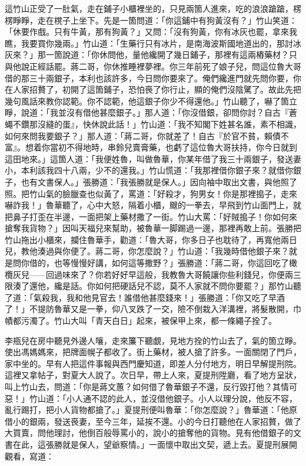 這竹山正受了一肚氣，走在鋪子小櫃裡坐的，只見兩箇人進來，吃的浪浪蹌蹌，楞楞睜睜，走在櫈子上坐下。{}先是一箇問道：「你這鋪中有狗黃沒有？」竹山笑道：「休要作戲。只有牛黃，那有狗黃？」又問：「沒有狗黃，你有冰灰也罷，拿來我瞧，我要買你幾兩。」竹山道：「生藥行只有冰片，是南海波斯國地道出的，那討冰灰來？」那一箇說道：「你休問他，量他纔開了幾日鋪子，那裡有這兩樁藥材？只與他說正經話罷。蔣二哥，你休推睡裡夢裡。你三年前死了娘子兒，問這位魯大哥借的那三十兩銀子，本利也該許多，今日問你要來了。俺們纔進門就先問你要，你在人家招贅了，初開了這箇鋪子，恐怕䘮了你行止，顯的俺們沒陰騭了。故此先把幾句風話來教你認範。你不認範，他這銀子你少不得還他。」竹山聽了，嚇了箇立睜，說道：「我並沒有借他甚麼銀子。」那人道：「你沒借銀，卻問你討？自古『蒼蠅不鑽那沒縫的蛋』，快休說此話！」竹山道：「我不知閣下姓甚名誰，素不相識，如何來問我要銀子？」那人道：「蔣二哥，你就差了！自古『於官不貧，賴債不富』。想着你當初不得地時，串鈴兒賣膏藥，{}也虧了這位魯大哥扶持，你今日就到這田地來。」這箇人道：「我便姓魯，叫做魯華，{}你某年借了我三十兩銀子，發送妻小，本利該我四十八兩，少不的還我。」竹山慌道：「我那裡借你銀子來？就借你銀子，也有文書保人。」張勝道：「我張勝就是保人。」因向袖中取出文書，與他照了照。把竹山氣的臉臘查也似黃了，罵道：「好殺才，狗男女！你是那裡搗子，走來嚇詐我！」魯華聽了，心中大怒，隔着小櫃，颼的一拳去，早飛到竹山面門上，就把鼻子打歪在半邊，一面把架上藥材撒了一街。竹山大罵：「好賊搗子！你如何來搶奪我貨物？」因叫天福兒來幫助，被魯華一脚踢過一邊，那裡再敢上前。張勝把竹山拖出小櫃來，攔住魯華手，勸道：「魯大哥，你多日子也耽待了，再寬他兩日兒，教他湊過與你便了。蔣二哥，你怎麼說？」竹山道：「我幾時借他銀子來？就是問你借的，也等慢慢好講，如何這等撒野？」張勝道：「蔣二哥，你這回吃了橄欖灰兒——回過味來了？你若好好早這般，我教魯大哥饒讓你些利錢兒，你便兩三限湊了還他，纔是話。你如何把硬話兒不認，莫不人家就不問你要罷？」那竹山聽了道：「氣殺我，我和他見官去！誰借他甚麼錢來！」張勝道：「你又吃了早酒了！」不提防魯華又是一拳，仰八叉跌了一交，險不倒栽入洋溝裡，將髮散開，巾幘都污濁了。竹山大叫「青天白日」起來，被保甲上來，都一條繩子拴了。

李瓶兒在房中聽見外邊人嚷，走來簾下聽覷，見地方拴的竹山去了，氣的箇立睜。使出馮媽媽來，把牌面幌子都收了。街上藥材，被人搶了許多。一面關閉了門戶，家中坐的。早有人把這件事報與西門慶知道，即差人分付地方，明日早解提刑院。這裡又拿帖子，對夏大人說了。次日早，帶上人來，夏提刑陞廳，看了地方呈狀，叫上竹山去，問道：「你是蔣文蕙？如何借了魯華銀子不還，反行毀打他？其情可惡！」竹山道：「小人通不認的此人，並沒借他銀子。小人以理分說，他反不容，亂行踢打，把小人貨物都搶了。」夏提刑便叫魯華：「你怎麼說？」魯華道：「他原借小的銀兩，發送䘮妻，至今三年，延挨不還。小的今日打聽他在人家招贅，做了大買賣，問他理討，他倒百般辱罵小的，說小的搶奪他的貨物。見有他借銀子的文書在此，這張勝就是保人，望爺察情。」一面懷中取出文契，遞上去。夏提刑展開觀看，寫道：

